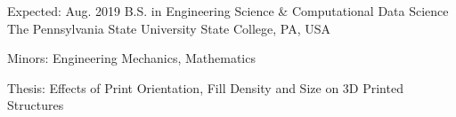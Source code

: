 
\begin{cventries}

	\cventry
	{Expected: Aug. 2019} %
	{B.S. in Engineering Science \& Computational Data Science} %
	{The Pennsylvania State University} %
	{State College, PA, USA} %
	{
		\begin{cvitems} %
			\item {Minors: Engineering Mechanics, Mathematics}
			\item {Thesis: Effects of Print Orientation, Fill Density and Size on 3D Printed Structures}
		\end{cvitems}
	}
	
\end{cventries}